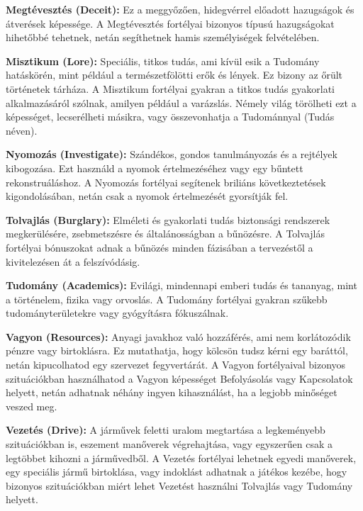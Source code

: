 \textbf{Megtévesztés (Deceit):} Ez a meggyőzően, hidegvérrel előadott hazugságok és átverések képessége. A Megtévesztés fortélyai bizonyos típusú hazugságokat hihetőbbé tehetnek, netán segíthetnek hamis személyiségek felvételében.

\textbf{Misztikum (Lore):} Speciális, titkos tudás, ami kívül esik a Tudomány hatáskörén, mint például a természetfölötti erők és lények. Ez bizony az őrült történetek tárháza. A Misztikum fortélyai gyakran a titkos tudás gyakorlati alkalmazásáról szólnak, amilyen például a varázslás. Némely világ törölheti ezt a képességet, lecserélheti másikra, vagy összevonhatja a Tudománnyal (Tudás néven).

\textbf{Nyomozás (Investigate):} Szándékos, gondos tanulmányozás és a rejtélyek kibogozása. Ezt használd a nyomok értelmezéséhez vagy egy bűntett rekonstruáláshoz. A Nyomozás fortélyai segítenek briliáns következtetések kigondolásában, netán csak a nyomok értelmezését gyorsítják fel.

\textbf{Tolvajlás (Burglary):} Elméleti és gyakorlati tudás biztonsági rendszerek megkerülésére, zsebmetszésre és általánosságban a bűnözésre. A Tolvajlás fortélyai bónuszokat adnak a bűnözés minden fázisában a tervezéstől a kivitelezésen át a felszívódásig.

\textbf{Tudomány (Academics):} Evilági, mindennapi emberi tudás és tananyag, mint a történelem, fizika vagy orvoslás. A Tudomány fortélyai gyakran szűkebb tudományterületekre vagy gyógyításra fókuszálnak.

\textbf{Vagyon (Resources):} Anyagi javakhoz való hozzáférés, ami nem korlátozódik pénzre vagy birtoklásra.  Ez mutathatja, hogy kölcsön tudsz kérni egy baráttól, netán kipucolhatod egy szervezet fegyvertárát. A Vagyon fortélyaival bizonyos szituációkban használhatod a Vagyon képességet Befolyásolás vagy Kapcsolatok helyett, netán adhatnak néhány ingyen kihasználást, ha a legjobb minőséget veszed meg.

\textbf{Vezetés (Drive):} A járművek feletti uralom megtartása a legkeményebb szituációkban is, eszement manőverek végrehajtása, vagy egyszerűen csak a legtöbbet kihozni a járművedből. A Vezetés fortélyai lehetnek egyedi manőverek, egy speciális jármű birtoklása, vagy indoklást adhatnak a játékos kezébe, hogy bizonyos szituációkban miért lehet Vezetést használni Tolvajlás vagy Tudomány helyett.
